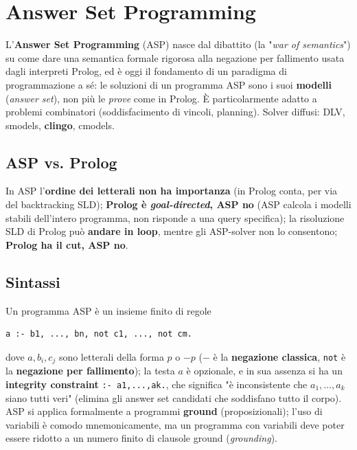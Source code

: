 \documentclass[a4paper,11pt]{article}
\begin{document}
\newpage
\section{Answer Set Programming}

L'\textbf{Answer Set Programming} (ASP) nasce dal dibattito (la "\emph{war of semantics}") su come dare una semantica formale rigorosa alla negazione per fallimento usata dagli interpreti Prolog, ed è oggi il fondamento di un paradigma di programmazione a sé: le soluzioni di un programma ASP sono i suoi \textbf{modelli} (\emph{answer set}), non più le \emph{prove} come in Prolog. È particolarmente adatto a problemi combinatori (soddisfacimento di vincoli, planning). Solver diffusi: DLV, smodels, \textbf{clingo}, cmodels.

\subsection{ASP vs. Prolog}

In ASP l'\textbf{ordine dei letterali non ha importanza} (in Prolog conta, per via del backtracking SLD); \textbf{Prolog è \emph{goal-directed}, ASP no} (ASP calcola i modelli stabili dell'intero programma, non risponde a una query specifica); la risoluzione SLD di Prolog può \textbf{andare in loop}, mentre gli ASP-solver non lo consentono; \textbf{Prolog ha il cut, ASP no}.

\subsection{Sintassi}

Un programma ASP è un insieme finito di regole
\begin{lstlisting}
a :- b1, ..., bn, not c1, ..., not cm.
\end{lstlisting}
dove $a,b_i,c_j$ sono letterali della forma $p$ o $-p$ ($-$ è la \textbf{negazione classica}, \texttt{not} è la \textbf{negazione per fallimento}); la testa $a$ è opzionale, e in sua assenza si ha un \textbf{integrity constraint} \texttt{:- a1,...,ak.}, che significa "è inconsistente che $a_1,\ldots,a_k$ siano tutti veri" (elimina gli answer set candidati che soddisfano tutto il corpo). ASP si applica formalmente a programmi \textbf{ground} (proposizionali); l'uso di variabili è comodo mnemonicamente, ma un programma con variabili deve poter essere ridotto a un numero finito di clausole ground (\emph{grounding}).
\end{document}

